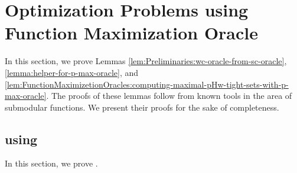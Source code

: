 \section{Optimization Problems using Function Maximization Oracle}\label{appendix:sec:Function-Maximization-Oracles}
In this section, we prove Lemmas 
\ref{lem:Preliminaries:wc-oracle-from-sc-oracle}, \ref{lemma:helper-for-p-max-oracle}, and \ref{lem:FunctionMaximizetionOracles:computing-maximal-pHw-tight-sets-with-p-max-oracle}. The proofs of these lemmas follow from known tools in the area of submodular functions. We present their proofs for the sake of completeness. 



\subsection{ using }\label{sec:wc-oracle-from-sc-oracle}
In this section, we prove . 
\lemmaWCoraclefromSCoracle*
